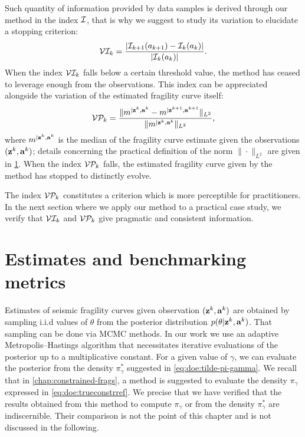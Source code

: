 Such quantity of information provided by data samples is derived through our method in the index $\mathcal{I}$, that is why we suggest to study its variation to elucidate a {stopping} criterion:
\begin{equation}
    \mathcal{V}\mathcal{I}_k = \frac{|\mathcal{I}_{k+1}(a_{k+1})-\mathcal{I}_k(a_k)|}{|\mathcal{I}_k(a_k)|}.
\end{equation}
When the index $\mathcal{V}\mathcal{I}_k$ falls below a certain threshold value, the method has ceased to leverage enough from the observations.
This index can be appreciated alongside the variation of the estimated fragility curve itself:
    \begin{equation}
            \mathcal{V}\mathcal{P}_k = \frac{\|m^{|\mathbf{z}^k,\mathbf{a}^k} - m^{|\mathbf{z}^{k+1},\mathbf{a}^{k+1}}\|_{L^2}}{\|m^{|\mathbf{z}^k,\mathbf{a}^k}\|_{L^2}},
    \end{equation}
where $m^{|\mathbf{z}^k,\mathbf{a}^k}$ is the median of the fragility curve estimate given the observations $(\mathbf{z}^k,\mathbf{a}^k)$; details concerning the practical definition of the norm $\|\cdot\|_{L^2}$ are given in \cref{sec:doe:metrics}.
When the index $\mathcal{V}\mathcal{P}_k $ falls, the estimated fragility curve given by the method has stopped to distinctly evolve.

The index $\mathcal{V}\mathcal{P}_k$ constitutes a criterion which is more perceptible {for practitioners}.
In the next section where we apply our method to a practical case study,{ we verify that $\mathcal{V}\mathcal{I}_k$ and $\mathcal{V}\mathcal{P}_k$ give pragmatic and consistent information.}





\section{Estimates and benchmarking metrics}\label{sec:doe:metrics}




Estimates of seismic fragility curves given observation $(\mathbf{z}^k,\mathbf{a}^k)$ are obtained by sampling i.i.d values of $\theta$ from the posterior distribution $p(\theta|\mathbf{z}^k,\mathbf{a}^k)$. That sampling can be done via MCMC methods. In our work we use an adaptive Metropolis–Hastings algorithm \citep{haario_adaptive_2001} that necessitates iterative evaluations of the posterior up to a multiplicative constant.
For a given value of $\gamma$, we can evaluate the posterior from the density $\pi^\ast_\gamma$ suggested in \cref{eq:doe:tilde-pi-gamma}. 
We recall that in \cref{chap:constrained-frags}, a method is suggested to evaluate the density $\pi_\gamma$ expressed in \cref{eq:doe:trueconstrref}.
We precise that we have verified that the results obtained from this method to compute $\pi_\gamma$ or from 
the density $\pi^\ast_\gamma$ are indiscernible. Their comparison is not the point of this chapter and is not discussed in the following.


